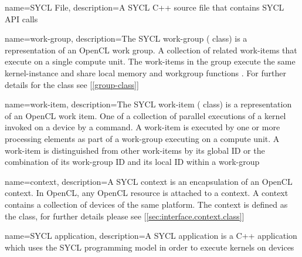 {
  name={SYCL File},
  description={A SYCL C++ source file that contains SYCL API calls}
}

{
  name={work-group},
  description={The SYCL work-group ( class) is a
               representation of an OpenCL work group. A collection of related
               work-items that execute on a single compute unit. The
               work-items in the group execute the same kernel-instance and
               share local memory and workgroup functions \cite{opencl12}. For
               further details for the  class see
               [\ref{group-class}]}
}

{
  name={work-item},
  description={The SYCL work-item ( class) is a
               representation of an OpenCL work item. One of a collection of
               parallel executions of a kernel invoked on a \gls{device} by a
               command. A work-item is executed by one or more processing
               elements as part of a work-group executing on a compute unit. A
               work-item is distinguished from other work-items by its global ID
               or the combination of its work-group ID and its local ID within a
               work-group \cite{opencl12}}
}

{
  name={context},
  description={A SYCL context is an encapsulation of an OpenCL context. In OpenCL,
         any OpenCL resource is attached to a context. A context contains a
         collection of \glspl{device} of the same \gls{platform}. The context is
         defined as the  class, for further
               details please see [\ref{sec:interface.context.class}]}
}

{
  name={SYCL application},
  description={A SYCL application is a C++ application which uses the SYCL
         programming model in order to execute \glspl{kernel} on
         \glspl{device}}
}


